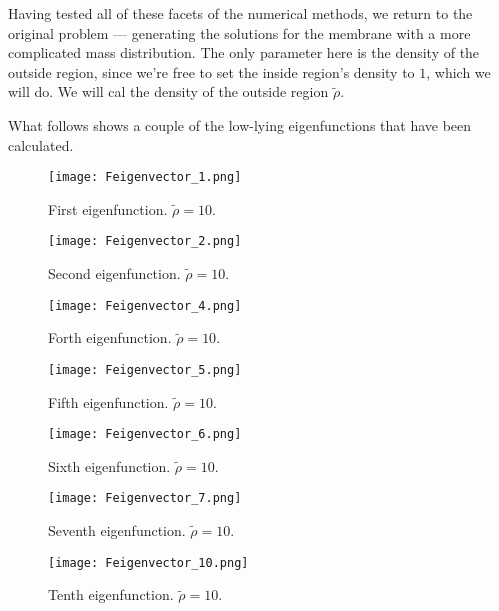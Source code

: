 \documentclass[10pt,a4paper,twocolumn]{article}
\begin{document}
Having tested all of these facets of the numerical methods, we return to the original problem --- generating the solutions for the membrane with a more complicated mass distribution. The only parameter here is the density of the outside region, since we're free to set the inside region's density to $1$, which we will do. We will cal the density of the outside region $\tilde{\rho}$.

What follows shows a couple of the low-lying eigenfunctions that have been calculated.

\begin{figure}[!hb]
    \centering
    \texttt{[image: Feigenvector\_1.png]}
    \caption{First eigenfunction. $\tilde{\rho} = 10$.}
    \label{fig:Feig_1}
\end{figure}

\newpage
\begin{figure}[!ht]
    \centering
    \texttt{[image: Feigenvector\_2.png]}
    \caption{Second eigenfunction. $\tilde{\rho} = 10$.}
    \label{fig:Feig_2}
\end{figure}

\begin{figure}[!h]
    \centering
    \texttt{[image: Feigenvector\_4.png]}
    \caption{Forth eigenfunction. $\tilde{\rho} = 10$.}
    \label{fig:Feig_4}
\end{figure}

\begin{figure}[!hb]
    \centering
    \texttt{[image: Feigenvector\_5.png]}
    \caption{Fifth eigenfunction. $\tilde{\rho} = 10$.}
    \label{fig:Feig_5}
\end{figure}

\begin{figure}[!ht]
    \centering
    \texttt{[image: Feigenvector\_6.png]}
    \caption{Sixth eigenfunction. $\tilde{\rho} = 10$.}
    \label{fig:Feig_6}
\end{figure}

\begin{figure}[!h]
    \centering
    \texttt{[image: Feigenvector\_7.png]}
    \caption{Seventh eigenfunction. $\tilde{\rho} = 10$.}
    \label{fig:Feig_7}
\end{figure}

\begin{figure}[!hb]
    \centering
    \texttt{[image: Feigenvector\_10.png]}
    \caption{Tenth eigenfunction. $\tilde{\rho} = 10$.}
    \label{fig:Feig_10}
\end{figure}
\end{document}
